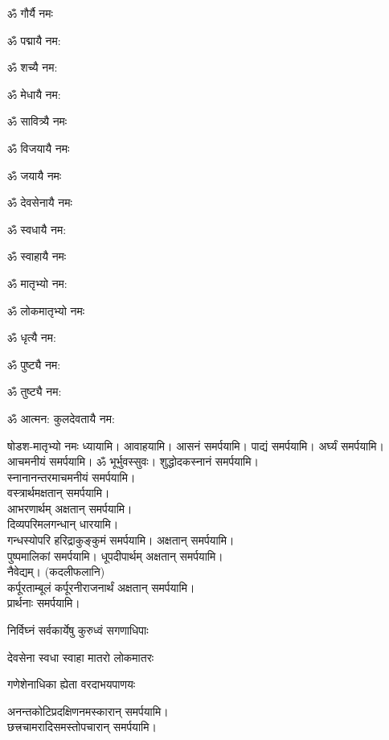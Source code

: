 
\begin{enumerate}%
\begin{minipage}{0.475\linewidth}   
\item ॐ गौर्यै नमः
\item ॐ पद्मायै नम​:
\item ॐ शच्यै नम​:
\item ॐ मेधायै नम​:
\item ॐ सावित्र्यै नमः
\item ॐ विजयायै नमः
\item ॐ जयायै नमः
\item ॐ देवसेनायै नमः
  \end{minipage}
  \begin{minipage}{0.525\linewidth}
\item ॐ स्वधायै नम​:
\item ॐ स्वाहायै नमः
\item ॐ मातृभ्यो नम​:
\item ॐ लोकमातृभ्यो नमः
\item ॐ धृत्यै नम​:
\item ॐ पुष्ट्यै नम​:
\item ॐ तुष्ट्यै नम​:
\item ॐ आत्मन​: कुलदेवतायै नम​:
  \end{minipage}
\end{enumerate}

षोडश-मातृभ्यो नमः ध्यायामि। आवाहयामि। आसनं समर्पयामि।
पाद्यं समर्पयामि। अर्घ्यं समर्पयामि। आचमनीयं समर्पयामि। 
ॐ भूर्भुवस्सुवः। शुद्धोदकस्नानं समर्पयामि।\\
स्नानानन्तरमाचमनीयं समर्पयामि।\\
वस्त्रार्थमक्षतान् समर्पयामि।\\
आभरणार्थम् अक्षतान् समर्पयामि।\\
दिव्यपरिमलगन्धान् धारयामि।\\
गन्धस्योपरि हरिद्राकुङ्कुमं समर्पयामि। अक्षतान् समर्पयामि। \\
पुष्पमालिकां समर्पयामि।
धूपदीपार्थम् अक्षतान् समर्पयामि।\\

नैवेद्यम्। (कदलीफलानि)\\
कर्पूरताम्बूलं कर्पूरनीराजनार्थं अक्षतान् समर्पयामि।\\
प्रार्थनाः समर्पयामि।

{निर्विघ्नं सर्वकार्येषु कुरुध्वं सगणाधिपाः}

{देवसेना स्वधा स्वाहा मातरो लोकमातरः}

{गणेशेनाधिका ह्येता वरदाभयपाणयः}


अनन्तकोटिप्रदक्षिणनमस्कारान् समर्पयामि।\\
छत्त्रचामरादिसमस्तोपचारान् समर्पयामि।\\